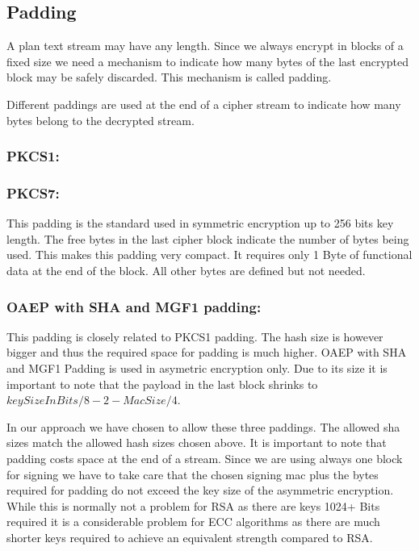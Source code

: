 
\subsection{Padding}
A plan text stream may have any length. Since we always encrypt in blocks of a fixed size we need a mechanism to indicate how many bytes of the last encrypted block may be safely discarded. This mechanism is called padding. 

Different paddings are used at the end of a cipher stream to indicate how many bytes belong to the decrypted stream.
\subsubsection{PKCS1:}  

\subsubsection{PKCS7:} This padding is the standard used in symmetric encryption up to 256 bits key length. The free bytes in the last cipher block indicate the number of bytes being used. This makes this padding very compact. It requires only 1 Byte of functional data at the end of the block. All other bytes are defined but not needed.

\subsubsection{OAEP with SHA and MGF1 padding:} This padding is closely related to PKCS1 padding. The hash size is however bigger and thus the required space for padding is much higher. OAEP with SHA and MGF1 Padding is used in asymetric encryption only. Due to its size it is important to note that the payload in the last block shrinks to $keySizeInBits/8-2-MacSize/4$.

In our approach we have chosen to allow these three paddings. The allowed sha sizes match the allowed hash sizes chosen above. It is important to note that padding costs space at the end of a stream. Since we are using always one block for signing we have to take care that the chosen signing mac plus the bytes required for padding do not exceed the key size of the asymmetric encryption. While this is normally not a problem for RSA as there are keys 1024+ Bits required it is a considerable problem for ECC algorithms as there are much shorter keys required to achieve an equivalent strength compared to RSA.

